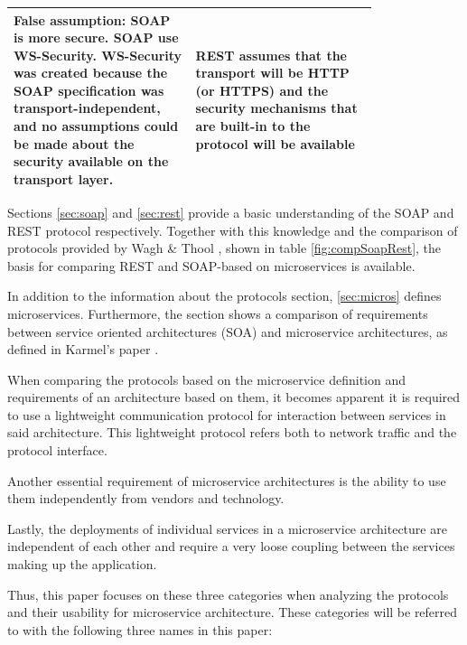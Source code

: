 \documentclass[conference]{IEEEtran}
\begin{document}
\begin{table}[!htbp]
\begin{tabular}{| p{0.4\linewidth} | p{0.4\linewidth}|}
		False assumption: SOAP is more secure. SOAP use WS-Security. WS-Security was created because the SOAP specification was transport-independent, and no assumptions could be made about the security available on the transport layer. & REST assumes that the transport will be HTTP (or HTTPS) and the security mechanisms that are built-in to the protocol will be available\\\hline
	\end{tabular}
\end{table}

Sections \ref{sec:soap} and \ref{sec:rest} provide a basic understanding of the SOAP and REST protocol respectively. Together with this knowledge and the comparison of protocols provided by Wagh \& Thool \cite{wagh2012comparative}, shown in table \ref{fig:compSoapRest}, the basis for comparing REST and SOAP-based on microservices is available.

In addition to the information about the protocols section, \ref{sec:micros} defines microservices. Furthermore, the section shows a comparison of requirements between service oriented architectures (SOA) and microservice architectures, as defined in Karmel's paper \cite{karmel2016nist}.

When comparing the protocols based on the microservice definition and requirements of an architecture based on them, it becomes apparent it is required to use a lightweight communication protocol for interaction between services in said architecture. This lightweight protocol refers both to network traffic and the protocol interface.

Another essential requirement of microservice architectures is the ability to use them independently from vendors and technology.

Lastly, the deployments of individual services in a microservice architecture are independent of each other and require a very loose coupling between the services making up the application.

Thus, this paper focuses on these three categories when analyzing the protocols and their usability for microservice architecture. These categories will be referred to with the following three names in this paper:
\end{document}
